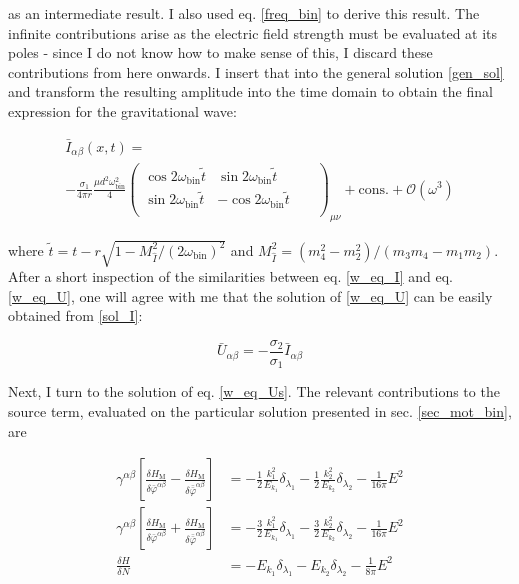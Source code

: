 \documentclass[11pt]{article}
\begin{document}
as an intermediate result. I also used eq. \ref{freq_bin} to derive this result.
The infinite contributions arise as the electric field strength must be evaluated at its poles - since I do not know how to make sense of this, I discard these contributions from here onwards. I insert that into the general solution \ref{gen_sol} and transform the resulting amplitude into the time domain to obtain the final expression for the gravitational wave:

\begin{multline} \label{sol_I}
	\bar I_{\alpha \beta} \left( x, t\right)
	=
	\\
	- \frac{\sigma_1}{4 \pi r}
	\frac{\mu d^2 \omega_{\text{bin}}^2}{4} 
	\begin{pmatrix}
		\cos{2 \omega_{\text{bin}} \tilde t}
		 & \sin{2 \omega_{\text{bin}} \tilde t}
		 &
		 \\
		 \sin{2 \omega_{\text{bin}} \tilde t}
		 & - \cos{2 \omega_{\text{bin}} \tilde t}
		 &
		 \\
		 &
		 &
		 &
	\end{pmatrix}_{\mu \nu}
	+ \text{cons.}
	+ \mathcal{O} \left( \omega^3 \right)
\end{multline}

where $\tilde t = t - r \sqrt{1 - M^2_{\hat I} / \left( 2 \omega_{\text{bin}}\right)^2 }$ and $M_{\hat I }^2  =  \left( m_4^2 - m_2^2\right) / \left( m_3 m_4 - m_1 m_2 \right) $. After a short inspection of the similarities between eq. \ref{w_eq_I} and eq. \ref{w_eq_U}, one will agree with me that the solution of \ref{w_eq_U} can be easily obtained from \ref{sol_I}:

\begin{equation}
	\bar U _{\alpha \beta} = - \frac{\sigma_2}{\sigma_1} \bar I_{\alpha \beta}
\end{equation}

Next, I turn to the solution of eq. \ref{w_eq_Us}. The relevant contributions to the source term, evaluated on the particular solution presented in sec. \ref{sec_mot_bin}, are

\begin{align}
	\gamma^{\alpha \beta} 
	\left[ 
		\frac{
			\delta H_{\text{M}}
		}{
			\delta \bar{\varphi}^{\alpha \beta}
		}
		-
		\frac{
			\delta H_{\text{M}}
		}{
			\delta \bar{\bar{\varphi}}^{\alpha \beta}
		}
	\right]
	&=
	-\frac{1}{2} \frac{k_1^2}{E_{k_1}} \delta_{\lambda_1} 
	-\frac{1}{2} \frac{k_2^2}{E_{k_2}} \delta_{\lambda_2} 
	- \frac{1}{16 \pi} E^2 \\
		\gamma^{\alpha \beta} 
	\left[ 
		\frac{
			\delta H_{\text{M}}
		}{
			\delta \bar{\varphi}^{\alpha \beta}
		}
		+
		\frac{
			\delta H_{\text{M}}
		}{
			\delta \bar{\bar{\varphi}}^{\alpha \beta}
		}
	\right]
	&=
	-\frac{3}{2} \frac{k_1^2}{E_{k_1}} \delta_{\lambda_1} 
	-\frac{3}{2} \frac{k_2^2}{E_{k_2}} \delta_{\lambda_2} 
	- \frac{1}{16 \pi} E^2 \\
	\frac{\delta H }{\delta N} 
	&= 
	- E_{k_1} \delta_{\lambda_1} 
	-E_{k_2} \delta_{\lambda_2} 
	- \frac{1}{8 \pi} E^2 
\end{align}
\end{document}
